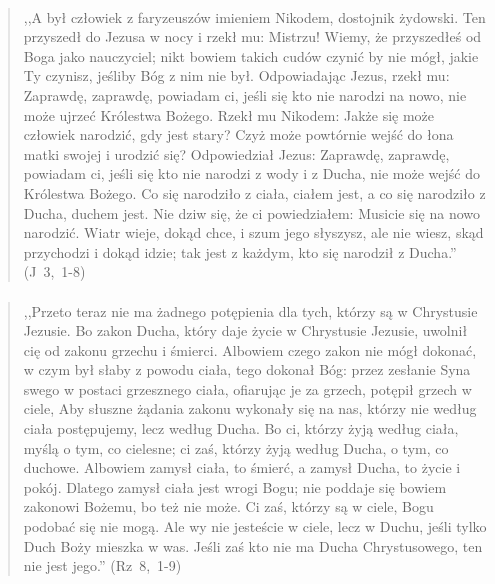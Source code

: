 \documentclass[10pt,a4paper,oneside]{article}
\begin{document}
\paragraph{}
\begin{quote}
,,A był człowiek z faryzeuszów imieniem Nikodem, dostojnik żydowski. Ten przyszedł do Jezusa w nocy i rzekł mu: Mistrzu! Wiemy, że przyszedłeś od Boga jako nauczyciel; nikt bowiem takich cudów czynić by nie mógł, jakie Ty czynisz, jeśliby Bóg z nim nie był. Odpowiadając Jezus, rzekł mu: Zaprawdę, zaprawdę, powiadam ci, jeśli się kto nie narodzi na nowo, nie może ujrzeć Królestwa Bożego. Rzekł mu Nikodem: Jakże się może człowiek narodzić, gdy jest stary? Czyż może powtórnie wejść do łona matki swojej i urodzić się? Odpowiedział Jezus: Zaprawdę, zaprawdę, powiadam ci, jeśli się kto nie narodzi z wody i z Ducha, nie może wejść do Królestwa Bożego. Co się narodziło z ciała, ciałem jest, a co się narodziło z Ducha, duchem jest. Nie dziw się, że ci powiedziałem: Musicie się na nowo narodzić. Wiatr wieje, dokąd chce, i szum jego słyszysz, ale nie wiesz, skąd przychodzi i dokąd idzie; tak jest z każdym, kto się narodził z Ducha.'' \mbox{(J 3, 1-8)}
\end{quote}
\paragraph{}
\begin{quote}
,,Przeto teraz nie ma żadnego potępienia dla tych, którzy są w Chrystusie Jezusie. Bo zakon Ducha, który daje życie w Chrystusie Jezusie, uwolnił cię od zakonu grzechu i śmierci. Albowiem czego zakon nie mógł dokonać, w czym był słaby z powodu ciała, tego dokonał Bóg: przez zesłanie Syna swego w postaci grzesznego ciała, ofiarując je za grzech, potępił grzech w ciele, Aby słuszne żądania zakonu wykonały się na nas, którzy nie według ciała postępujemy, lecz według Ducha. Bo ci, którzy żyją według ciała, myślą o tym, co cielesne; ci zaś, którzy żyją według Ducha, o tym, co duchowe. Albowiem zamysł ciała, to śmierć, a zamysł Ducha, to życie i pokój. Dlatego zamysł ciała jest wrogi Bogu; nie poddaje się bowiem zakonowi Bożemu, bo też nie może. Ci zaś, którzy są w ciele, Bogu podobać się nie mogą. Ale wy nie jesteście w ciele, lecz w Duchu, jeśli tylko Duch Boży mieszka w was. Jeśli zaś kto nie ma Ducha Chrystusowego, ten nie jest jego.'' \mbox{(Rz 8, 1-9)}
\end{quote}
\end{document}
